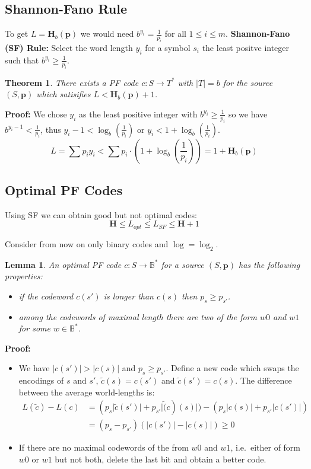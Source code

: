 \documentclass[11pt]{article}
\newtheorem{theo}{Theorem}
\newtheorem{lem}{Lemma}
\begin{document}
\subsection{Shannon-Fano Rule}
To get $L = \textbf{H}_b(\textbf{p})$ we would need $b^{y_i} = \frac{1}{p_i}$ for all $1 \leq i \leq m$.
\textbf{Shannon-Fano (SF) Rule:}
Select the word length $y_i$ for a symbol $s_i$ the least positve integer such that $b^{y_i} \geq \frac{1}{p_i}$.
\begin{theo}
  There exists a PF code $c : S \rightarrow T^*$ with $\lvert T \rvert = b$ for the source $(S, \textbf{p})$ which satisifies $L < \textbf{H}_b(\textbf{p}) + 1$.
\end{theo}

\textbf{Proof:}
We chose $y_i$ as the least positive integer with $b^{y_i} \geq \frac{1}{p_i}$ so we have $b^{y_i - 1} < \frac{1}{p_i}$, thus $y_i - 1 < \log_b(\frac{1}{p_i})$ or $y_i < 1 + \log_b(\frac{1}{p_i})$.
\[
  L = \sum p_iy_i < \sum p_i \cdot (1 + \log_b(\frac{1}{p_i})) = 1 + \textbf{H}_b(\textbf{p})
\]

\subsection{Optimal PF Codes}
Using SF we can obtain good but not optimal codes:
\[
  \textbf{H} \leq L_{opt} \leq L_{SF} \leq \textbf{H} + 1
\]

Consider from now on only binary codes and $\log = \log_2$.

\begin{lem}
  An optimal PF code $c : S \rightarrow \mathbb{B}^*$ for a source $(S, \textbf{p})$ has the following properties:
  \begin{itemize}
    \item if the codeword $c(s')$ is longer than $c(s)$ then $p_s \geq p_{s'}$.
    \item among the codewords of maximal length there are two of the form $w0$ and $w1$ for some $w \in \mathbb{B}^*$.
  \end{itemize}
\end{lem}

\textbf{Proof:}
\begin{itemize}
  \item We have $\lvert c(s') \rvert > \lvert c(s) \rvert$ and $p_s \geq p_{s'}$.
    Define a new code which swaps the encodings of $s$ and $s'$, $\tilde{c}(s) = c(s')$ and $\tilde{c}(s') = c(s)$.
    The difference between the average world-lengths is:
    \begin{align*}
      L(\tilde{c}) - L(c) &= (p_s \lvert \tilde{c}(s') \rvert + p_{s'} \lvert \tilde(c)(s) \rvert) - (p_s \lvert c(s) \rvert + p_{s'} \lvert c(s') \rvert) \\
      &= (p_s - p_{s'})(\lvert c(s') \rvert - \lvert c(s) \rvert) \geq 0
    \end{align*}
  \item If there are no maximal codewords of the from $w0$ and $w1$, i.e.\ either of form $w0$ or $w1$ but not both, delete the last bit and obtain a better code.
\end{itemize}
\end{document}
